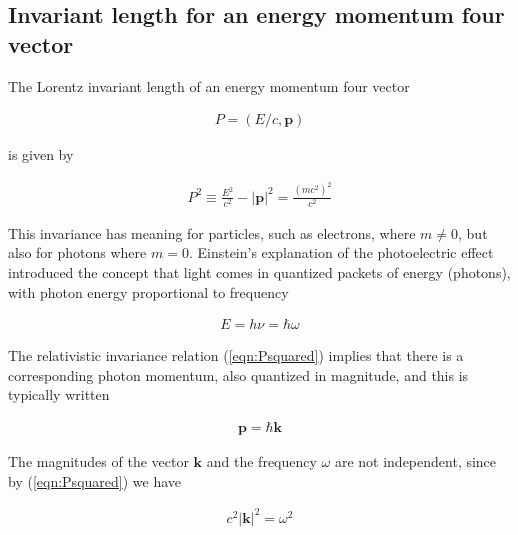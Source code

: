\documentclass[]{eliblog}
\newcommand{\Abs}[1]{{\left\lvert{#1}\right\rvert}}
\newcommand{\BB}[0]{\mathbf{B}}
\newcommand{\BE}[0]{\mathbf{E}}
\newcommand{\Bk}[0]{\mathbf{k}}
\newcommand{\Bp}[0]{\mathbf{p}}
\newcommand{\cross}[0]{\times}
\begin{document}
\subsection{Invariant length for an energy momentum four vector}

The Lorentz invariant length of an energy momentum four vector

\begin{align}
P = (E/c, \Bp)
\end{align}

is given by

\begin{align}\label{eqn:Psquared}
P^2 \equiv \frac{E^2}{c^2} - \Abs{\Bp}^2 = \frac{(m c^2)^2}{c^2}
\end{align}

This invariance has meaning for particles, such as electrons, where $m \ne 0$, but also for photons where $m = 0$.
Einstein's explanation of the photoelectric effect introduced the concept that light comes in
quantized packets of energy (photons), with photon energy proportional to frequency

\begin{align}
E = h \nu = \hbar \omega
\end{align}

The relativistic invariance relation (\ref{eqn:Psquared}) implies that there is a corresponding photon momentum, also
quantized in magnitude, and this is typically written

\begin{align}
\Bp = \hbar \Bk
\end{align}

The magnitudes of the vector $\Bk$ and the frequency $\omega$ are not independent, since by (\ref{eqn:Psquared}) we have

\begin{align}\label{eqn:omegaKsquared}
c^2 \Abs{\Bk}^2 = \omega^2
\end{align}

%
%
%
\end{document}
